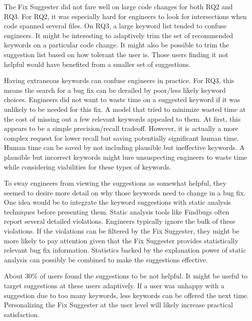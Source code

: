 \documentclass[conference]{IEEEtran}
\begin{document}
\begin{description}[leftmargin=\parindent,topsep=0pt,partopsep=3pt,parsep=0pt,itemsep=3pt]
	\item[Large Code Changes]
	The Fix Suggester did not fare well on large code changes for both RQ2 and RQ3. For RQ2, it was especially hard for engineers to look for intersections when code spanned several files. On RQ3, a large keyword list tended to confuse engineers. It might be interesting to adaptively trim the set of recommended keywords on a particular code change. It might also be possible to trim the suggestion list based on how tolerant the user is. Those users finding it not helpful would have benefited from a smaller set of suggestions.
	\item[Reducing Search Time]
	Having extraneous keywords can confuse engineers in practice. For RQ3, this means the search for a bug fix can be derailed by poor/less likely keyword choices. Engineers did not want to waste time on a suggested keyword if it was unlikely to be needed for this fix. A model that tried to minimize wasted time at the cost of missing out a few relevant keywords appealed to them. At first, this appears to be a simple precision/recall tradeoff. However, it is actually a more complex request for lower recall but saving potentially significant human time. Human time can be saved by not including plausible but ineffective keywords. A plausible but incorrect keywords might lure unsuspecting engineers to waste time while considering viabilities for these types of keywords.
	\item[More Detail]
	To sway engineers from viewing the suggestions as somewhat helpful, they seemed to desire more detail on why those keywords need to change in a bug fix. One idea would be to integrate the keyword suggestions with static analysis techniques before presenting them. Static analysis tools like Findbugs often report several detailed violations. Engineers typically ignore the bulk of these violations. If the violations can be filtered by the Fix Suggester, they might be more likely to pay attention given that the Fix Suggester provides statistically relevant bug fix information. Statistics backed by the explanation power of static analysis can possibly be combined to make the suggestions effective.
	\item[User Personalization] 
	About 30\% of users found the suggestions to be not helpful. It might be useful to target suggestions at these users adaptively. If a user was unhappy with a suggestion due to too many keywords, less keywords can be offered the next time. Personalizing the Fix Suggester at the user level will likely increase practical satisfaction.
	
\end{description}
\end{document}
